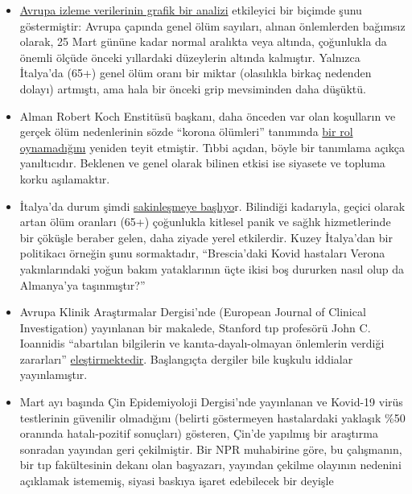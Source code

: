 \begin{itemize}
\tightlist
\item
  \href{https://off-guardian.org/2020/03/30/covid19-yet-to-impact-europes-overall-mortality/}{Avrupa
  izleme verilerinin grafik bir analizi} etkileyici bir biçimde şunu
  göstermiştir: Avrupa çapında genel ölüm sayıları, alınan önlemlerden
  bağımsız olarak, 25 Mart gününe kadar normal aralıkta veya altında,
  çoğunlukla da önemli ölçüde önceki yıllardaki düzeylerin altında
  kalmıştır. Yalnızca İtalya'da (65+) genel ölüm oranı bir miktar
  (olasılıkla birkaç nedenden dolayı) artmıştı, ama hala bir önceki grip
  mevsiminden daha düşüktü.
\item
  Alman Robert Koch Enstitüsü başkanı, daha önceden var olan koşulların
  ve gerçek ölüm nedenlerinin sözde ``korona ölümleri'' tanımında
  \href{https://swprs.org/rki-relativiert-corona-todesfaelle/}{bir rol
  oynamadığını} yeniden teyit etmiştir. Tıbbi açıdan, böyle bir
  tanımlama açıkça yanıltıcıdır. Beklenen ve genel olarak bilinen etkisi
  ise siyasete ve topluma korku aşılamaktır.
\item
  İtalya'da durum şimdi
  \href{https://www.tagesspiegel.de/politik/die-verlangsamung-ist-da-in-italien-zeichnet-sich-die-wende-in-der-coronakrise-ab/25698124.html}{sakinleşmeye
  başlıyo}r. Bilindiği kadarıyla, geçici olarak artan ölüm oranları
  (65+) çoğunlukla kitlesel panik ve sağlık hizmetlerinde bir çöküşle
  beraber gelen, daha ziyade yerel etkilerdir. Kuzey İtalya'dan bir
  politikacı örneğin şunu sormaktadır, ``Brescia'daki Kovid hastaları
  Verona yakınlarındaki yoğun bakım yataklarının üçte ikisi boş dururken
  nasıl olup da Almanya'ya taşınmıştır?''
\item
  Avrupa Klinik Araştırmalar Dergisi'nde (European Journal of Clinical
  Investigation) yayınlanan bir makalede, Stanford tıp profesörü John C.
  Ioannidis ``abartılan bilgilerin ve kanıta-dayalı-olmayan önlemlerin
  verdiği zararları''
  \href{https://onlinelibrary.wiley.com/doi/abs/10.1111/eci.13222}{eleştirmektedir}.
  Başlangıçta dergiler bile kuşkulu iddialar yayınlamıştır.
\item
  Mart ayı başında Çin Epidemiyoloji Dergisi'nde yayınlanan ve Kovid-19
  virüs testlerinin güvenilir olmadığını (belirti göstermeyen
  hastalardaki yaklaşık \%50 oranında hatalı-pozitif sonuçları)
  gösteren, Çin'de yapılmış bir araştırma sonradan yayından geri
  çekilmiştir. Bir NPR muhabirine göre, bu çalışmanın, bir tıp
  fakültesinin dekanı olan başyazarı, yayından çekilme olayının nedenini
  açıklamak istememiş, siyasi baskıya işaret edebilecek bir deyişle

\end{itemize}
